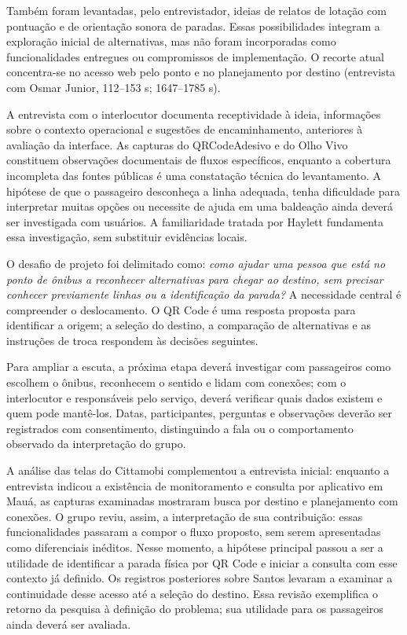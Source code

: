 Também foram levantadas, pelo entrevistador, ideias de relatos de lotação com pontuação e de orientação sonora de paradas. Essas possibilidades integram a exploração inicial de alternativas, mas não foram incorporadas como funcionalidades entregues ou compromissos de implementação. O recorte atual concentra-se no acesso web pelo ponto e no planejamento por destino  (entrevista com Osmar Junior, 112--153 s; 1647--1785 s).


A entrevista com o interlocutor documenta receptividade à ideia, informações sobre o contexto operacional e sugestões de encaminhamento, anteriores à avaliação da interface. As capturas do QRCodeAdesivo e do Olho Vivo constituem observações documentais de fluxos específicos, enquanto a cobertura incompleta das fontes públicas é uma constatação técnica do levantamento. A hipótese de que o passageiro desconheça a linha adequada, tenha dificuldade para interpretar muitas opções ou necessite de ajuda em uma baldeação ainda deverá ser investigada com usuários. A familiaridade tratada por Haylett fundamenta essa investigação, sem substituir evidências locais.

O desafio de projeto foi delimitado como: \textit{como ajudar uma pessoa que está no ponto de ônibus a reconhecer alternativas para chegar ao destino, sem precisar conhecer previamente linhas ou a identificação da parada?} A necessidade central é compreender o deslocamento. O QR Code é uma resposta proposta para identificar a origem; a seleção do destino, a comparação de alternativas e as instruções de troca respondem às decisões seguintes.

Para ampliar a escuta, a próxima etapa deverá investigar com passageiros como escolhem o ônibus, reconhecem o sentido e lidam com conexões; com o interlocutor e responsáveis pelo serviço, deverá verificar quais dados existem e quem pode mantê-los. Datas, participantes, perguntas e observações deverão ser registrados com consentimento, distinguindo a fala ou o comportamento observado da interpretação do grupo.

A análise das telas do Cittamobi complementou a entrevista inicial: enquanto a entrevista indicou a existência de monitoramento e consulta por aplicativo em Mauá, as capturas examinadas mostraram busca por destino e planejamento com conexões. O grupo reviu, assim, a interpretação de sua contribuição: essas funcionalidades passaram a compor o fluxo proposto, sem serem apresentadas como diferenciais inéditos. Nesse momento, a hipótese principal passou a ser a utilidade de identificar a parada física por QR Code e iniciar a consulta com esse contexto já definido. Os registros posteriores sobre Santos levaram a examinar a continuidade desse acesso até a seleção do destino. Essa revisão exemplifica o retorno da pesquisa à definição do problema; sua utilidade para os passageiros ainda deverá ser avaliada.

